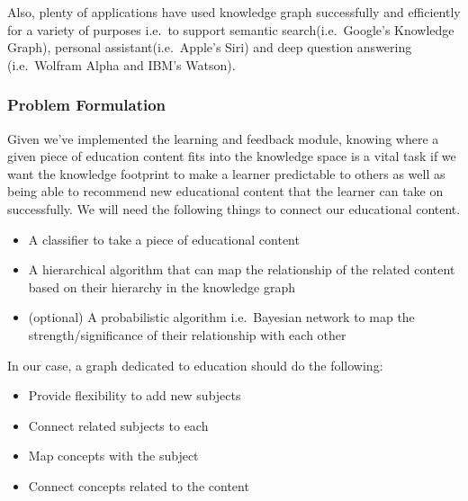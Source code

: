 \documentclass{acm_proc_article-sp}
\begin{document}
Also, plenty of applications have used knowledge graph successfully and
efficiently for a variety of purposes i.e.~to support semantic
search(i.e.~Google's Knowledge Graph), personal assistant(i.e.~Apple's
Siri) and deep question answering (i.e.~Wolfram Alpha and IBM's Watson).

\subsubsection{Problem Formulation}\label{problem-formulation-2}

Given we've implemented the learning and feedback module, knowing where
a given piece of education content fits into the knowledge space is a
vital task if we want the knowledge footprint to make a learner
predictable to others as well as being able to recommend new educational
content that the learner can take on successfully. We will need the
following things to connect our educational content.

\begin{itemize}
\item
  A classifier to take a piece of educational content
\item
  A hierarchical algorithm that can map the relationship of the related
  content based on their hierarchy in the knowledge graph
\item
  (optional) A probabilistic algorithm i.e.~Bayesian network to map the
  strength/significance of their relationship with each other
\end{itemize}

In our case, a graph dedicated to education should do the following:

\begin{itemize}
\item
  Provide flexibility to add new subjects
\item
  Connect related subjects to each
\item
  Map concepts with the subject
\item
  Connect concepts related to the content
\end{itemize}
\end{document}
